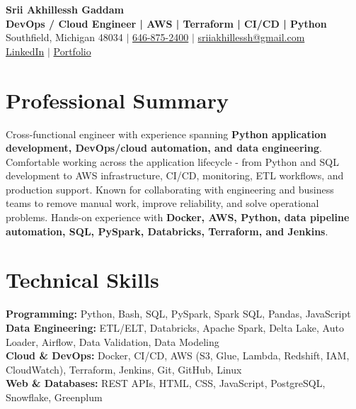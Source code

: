 \documentclass[letterpaper,10pt]{article}
\begin{document}
\fontsize{9.35pt}{10.45pt}\selectfont

\begin{center}
    {\LARGE \textbf{Srii Akhillessh Gaddam}} \\[-1pt]
    \textbf{DevOps / Cloud Engineer | AWS | Terraform | CI/CD | Python} \\[2pt]
    Southfield, Michigan 48034 $|$
    \href{tel:6468752400}{646-875-2400} $|$
    \href{mailto:sriiakhillessh@gmail.com}{sriiakhillessh@gmail.com} \\[1pt]
    \href{https://www.linkedin.com/in/srii-akhiilessh-gaddam-b48668191/}{LinkedIn} $|$
    \href{https://sriiakhillesshg.github.io/portfolio/}{Portfolio}
\end{center}
\vspace{-8pt}

\section{Professional Summary}
\small{Cross-functional engineer with experience spanning \textbf{Python application development, DevOps/cloud automation, and data engineering}. Comfortable working across the application lifecycle - from Python and SQL development to AWS infrastructure, CI/CD, monitoring, ETL workflows, and production support. Known for collaborating with engineering and business teams to remove manual work, improve reliability, and solve operational problems. Hands-on experience with \textbf{Docker, AWS, Python, data pipeline automation, SQL, PySpark, Databricks, Terraform, and Jenkins}.}

\section{Technical Skills}
\small{
\textbf{Programming:} Python, Bash, SQL, PySpark, Spark SQL, Pandas, JavaScript \\
\textbf{Data Engineering:} ETL/ELT, Databricks, Apache Spark, Delta Lake, Auto Loader, Airflow, Data Validation, Data Modeling \\
\textbf{Cloud \& DevOps:} Docker, CI/CD, AWS (S3, Glue, Lambda, Redshift, IAM, CloudWatch), Terraform, Jenkins, Git, GitHub, Linux \\
\textbf{Web \& Databases:} REST APIs, HTML, CSS, JavaScript, PostgreSQL, Snowflake, Greenplum
}
\end{document}
